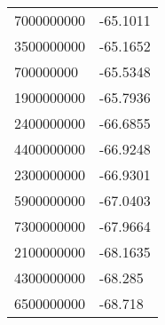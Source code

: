 \begin{tabular}{ll}
7000000000 & -65.1011 \\ 
3500000000 & -65.1652 \\ 
700000000 & -65.5348 \\ 
1900000000 & -65.7936 \\ 
2400000000 & -66.6855 \\ 
4400000000 & -66.9248 \\ 
2300000000 & -66.9301 \\ 
5900000000 & -67.0403 \\ 
7300000000 & -67.9664 \\ 
2100000000 & -68.1635 \\ 
4300000000 & -68.285 \\ 
6500000000 & -68.718 \\ 
\hline 
\end{tabular}